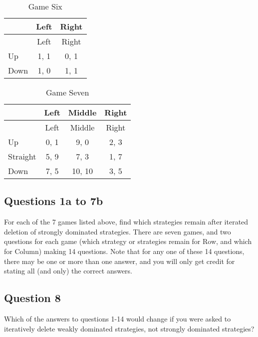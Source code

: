 \documentclass[
  11pt,
]{article}
\begin{document}
\begin{longtable}[]{@{}lcc@{}}
\caption{Game Six}\tabularnewline
\toprule
& Left & Right\tabularnewline
\midrule
\endfirsthead
\toprule
& Left & Right\tabularnewline
\midrule
\endhead
Up & 1, 1 & 0, 1\tabularnewline
Down & 1, 0 & 1, 1\tabularnewline
\bottomrule
\end{longtable}

\begin{longtable}[]{@{}lccc@{}}
\caption{Game Seven}\tabularnewline
\toprule
& Left & Middle & Right\tabularnewline
\midrule
\endfirsthead
\toprule
& Left & Middle & Right\tabularnewline
\midrule
\endhead
Up & 0, 1 & 9, 0 & 2, 3\tabularnewline
Straight & 5, 9 & 7, 3 & 1, 7\tabularnewline
Down & 7, 5 & 10, 10 & 3, 5\tabularnewline
\bottomrule
\end{longtable}

\hypertarget{questions-1a-to-7b}{%
\subsection{Questions 1a to 7b}\label{questions-1a-to-7b}}

For each of the 7 games listed above, find which strategies remain after
iterated deletion of strongly dominated strategies. There are seven
games, and two questions for each game (which strategy or strategies
remain for Row, and which for Column) making 14 questions. Note that for
any one of these 14 questions, there may be one or more than one answer,
and you will only get credit for stating all (and only) the correct
answers.

\hypertarget{question-8}{%
\subsection{Question 8}\label{question-8}}

Which of the answers to questions 1-14 would change if you were asked to
iteratively delete weakly dominated strategies, not strongly dominated
strategies?
\end{document}
